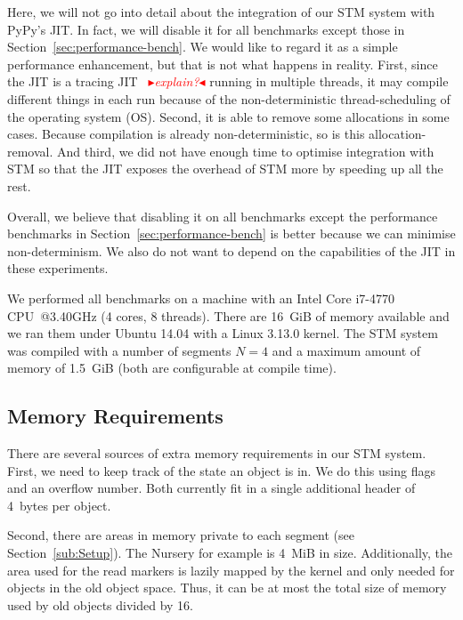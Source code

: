 \documentclass{sigplanconf}
\newcommand{\mynote}[2]{%
  \textcolor{red}{%
    \fbox{\bfseries\sffamily\scriptsize#1}%
    {\small$\blacktriangleright$\textsf{\emph{#2}}$\blacktriangleleft$}%
  }%
}
\newcommand\remi[1]{\mynote{Remi}{#1}}
\begin{document}
Here, we will not go into detail about the integration of our STM
system with PyPy's JIT. In fact, we will disable it for all benchmarks
except those in Section~\ref{sec:performance-bench}. We would like to
regard it as a simple performance enhancement, but that is not what
happens in reality. First, since the JIT is a tracing JIT~\cite{cfbolz09}
\remi{explain?}  running in multiple threads, it may compile
different things in each run because of the non-deterministic
thread-scheduling of the operating system (OS). Second, it is able to
remove some allocations in some cases. Because compilation is already
non-deterministic, so is this allocation-removal. And third, we did
not have enough time to optimise integration with STM so that the JIT
exposes the overhead of STM more by speeding up all the rest.

Overall, we believe that disabling it on all benchmarks except the
performance benchmarks in Section~\ref{sec:performance-bench} is better
because we can minimise non-determinism. We also do not want to depend
on the capabilities of the JIT in these experiments.

We performed all benchmarks on a machine with an Intel Core i7-4770
CPU~@3.40GHz (4 cores, 8 threads).  There are 16~GiB of memory
available and we ran them under Ubuntu 14.04 with a Linux 3.13.0
kernel. The STM system was compiled with a number of segments $N=4$
and a maximum amount of memory of 1.5~GiB (both are configurable at
compile time).




\subsection{Memory Requirements}

There are several sources of extra memory requirements in our
STM system. First, we need to keep track of the state an object
is in. We do this using flags and an overflow number. Both currently
fit in a single additional header of 4~bytes per object.

Second, there are areas in memory private to each segment (see
Section~\ref{sub:Setup}). The Nursery for example is 4~MiB in
size. Additionally, the area used for the read markers is lazily
mapped by the kernel and only needed for objects in the old object
space. Thus, it can be at most the total size of memory used by
old objects divided by 16.
\end{document}
